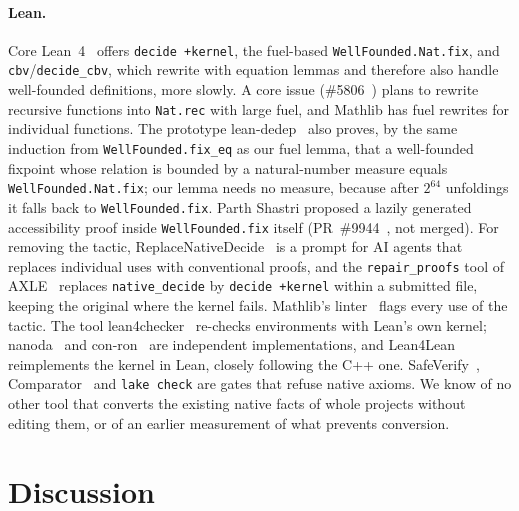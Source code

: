 \documentclass[11pt]{article}
\begin{document}
\paragraph{Lean.} Core Lean~4~\cite{lean4} offers \texttt{decide +kernel}, the fuel-based
\texttt{WellFounded.Nat.fix}, and \texttt{cbv}/\texttt{decide\_cbv}, which rewrite with equation
lemmas and therefore also handle well-founded definitions, more slowly. A core issue
(\#5806~\cite{issue5806}) plans to rewrite recursive functions into \texttt{Nat.rec} with large
fuel, and Mathlib has fuel rewrites for individual functions. The prototype lean-dedep~\cite{dedep} also proves, by
the same induction from \texttt{WellFounded.fix\_eq} as our fuel lemma, that a well-founded fixpoint
whose relation is bounded by a natural-number measure equals \texttt{WellFounded.Nat.fix}; our
lemma needs no measure, because after \(2^{64}\) unfoldings it falls back to
\texttt{WellFounded.fix}. Parth Shastri proposed a lazily generated accessibility proof inside
\texttt{WellFounded.fix} itself (PR~\#9944~\cite{pr9944}, not merged). For removing the tactic,
ReplaceNativeDecide~\cite{replacend} is a prompt for AI agents that replaces individual uses with
conventional proofs, and the \texttt{repair\_proofs} tool of AXLE~\cite{axle} replaces
\texttt{native\_decide} by \texttt{decide +kernel} within a submitted file, keeping the original
where the kernel fails. Mathlib's linter~\cite{mathliblint} flags every use of the tactic.
The tool lean4checker~\cite{lean4checker} re-checks environments with Lean's own kernel; nanoda~\cite{nanoda}
and con-ron~\cite{conron} are independent implementations, and Lean4Lean~\cite{lean4lean}
reimplements the kernel in Lean, closely following the C++ one. SafeVerify~\cite{safeverify},
Comparator~\cite{comparator} and \texttt{lake check} are gates that refuse native axioms. We know
of no other tool that converts the existing native facts of whole projects without editing them,
or of an earlier measurement of what prevents conversion.

\section{Discussion}\label{sec:discussion}
\end{document}
